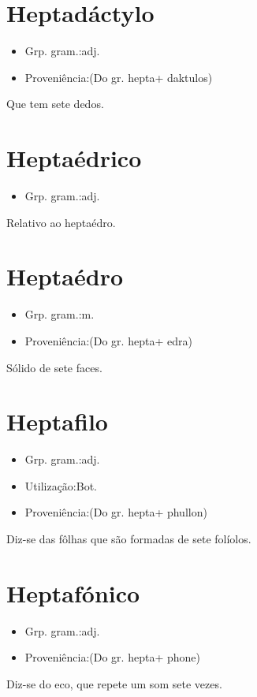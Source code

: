 \documentclass{article}
\begin{document}
\section{Heptadáctylo}
\begin{itemize}
\item {Grp. gram.:adj.}
\end{itemize}
\begin{itemize}
\item {Proveniência:(Do gr. \textunderscore hepta\textunderscore  + \textunderscore daktulos\textunderscore )}
\end{itemize}
Que tem sete dedos.
\section{Heptaédrico}
\begin{itemize}
\item {Grp. gram.:adj.}
\end{itemize}
Relativo ao heptaédro.
\section{Heptaédro}
\begin{itemize}
\item {Grp. gram.:m.}
\end{itemize}
\begin{itemize}
\item {Proveniência:(Do gr. \textunderscore hepta\textunderscore  + \textunderscore edra\textunderscore )}
\end{itemize}
Sólido de sete faces.
\section{Heptafilo}
\begin{itemize}
\item {Grp. gram.:adj.}
\end{itemize}
\begin{itemize}
\item {Utilização:Bot.}
\end{itemize}
\begin{itemize}
\item {Proveniência:(Do gr. \textunderscore hepta\textunderscore  + \textunderscore phullon\textunderscore )}
\end{itemize}
Diz-se das fôlhas que são formadas de sete folíolos.
\section{Heptafónico}
\begin{itemize}
\item {Grp. gram.:adj.}
\end{itemize}
\begin{itemize}
\item {Proveniência:(Do gr. \textunderscore hepta\textunderscore  + \textunderscore phone\textunderscore )}
\end{itemize}
Diz-se do eco, que repete um som sete vezes.
\end{document}
